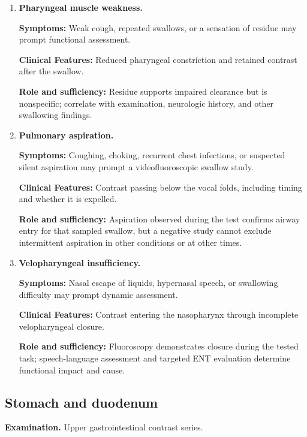 \begin{enumerate}[leftmargin=*,itemsep=0.45em,topsep=0.4em]
\item \textbf{Pharyngeal muscle weakness.}\par\noindent\textbf{Symptoms:} Weak cough, repeated swallows, or a sensation of residue may prompt functional assessment.\par\noindent\textbf{Clinical Features:} Reduced pharyngeal constriction and retained contrast after the swallow.\par\noindent\textbf{Role and sufficiency:} Residue supports impaired clearance but is nonspecific; correlate with examination, neurologic history, and other swallowing findings.
\item \textbf{Pulmonary aspiration.}\par\noindent\textbf{Symptoms:} Coughing, choking, recurrent chest infections, or suspected silent aspiration may prompt a videofluoroscopic swallow study.\par\noindent\textbf{Clinical Features:} Contrast passing below the vocal folds, including timing and whether it is expelled.\par\noindent\textbf{Role and sufficiency:} Aspiration observed during the test confirms airway entry for that sampled swallow, but a negative study cannot exclude intermittent aspiration in other conditions or at other times.
\item \textbf{Velopharyngeal insufficiency.}\par\noindent\textbf{Symptoms:} Nasal escape of liquids, hypernasal speech, or swallowing difficulty may prompt dynamic assessment.\par\noindent\textbf{Clinical Features:} Contrast entering the nasopharynx through incomplete velopharyngeal closure.\par\noindent\textbf{Role and sufficiency:} Fluoroscopy demonstrates closure during the tested task; speech-language assessment and targeted ENT evaluation determine functional impact and cause.
\end{enumerate}

\subsection{Stomach and duodenum}
\textbf{Examination.} Upper gastrointestinal contrast series.

